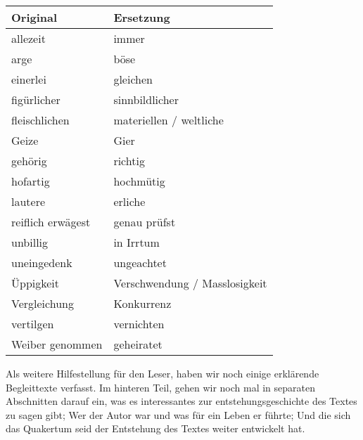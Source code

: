 \medskip

\begin{center}
\label{ref:tab_wortersetzungen}
\begin{tabular}{|l|l|} \hline
\textbf{Original}       & \textbf{Ersetzung}            \\ \hline \hline
allezeit                & immer                         \\ \hline
arge                    & böse                          \\ \hline
einerlei                & gleichen                      \\ \hline
figürlicher             & sinnbildlicher                \\ \hline
fleischlichen           & materiellen / weltliche       \\ \hline
Geize                   & Gier\\ \hline
gehörig                 & richtig                       \\ \hline
hofartig                & hochmütig                     \\ \hline
lautere                 & erliche                       \\ \hline
reiflich erwägest       & genau prüfst                  \\ \hline
unbillig                & in Irrtum                     \\ \hline
uneingedenk             & ungeachtet                    \\ \hline
Üppigkeit               & Verschwendung / Masslosigkeit          \\ \hline
Vergleichung            & Konkurrenz                     \\ \hline
vertilgen               & vernichten                    \\ \hline
Weiber genommen         & geheiratet                    \\ \hline
\end{tabular}
\end{center}
\medskip

\medskip

Als weitere Hilfestellung für den Leser, haben wir noch einige erklärende
Begleittexte verfasst. Im hinteren Teil, gehen wir noch mal in separaten
Abschnitten darauf ein, was es interessantes zur entstehungsgeschichte des
Textes zu sagen gibt; Wer der Autor war und was für ein Leben er führte; Und die
sich das Quakertum seid der Entstehung des Textes weiter entwickelt hat.

